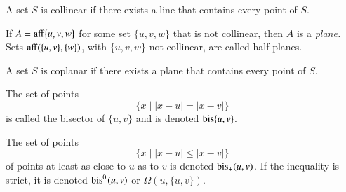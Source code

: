 \begin{tarskidata}
\begin{tarski}
\begin{definition}[collinear]  
A set $S$ is collinear if there exists
a line that contains every point of $S$.
\end{definition}
\end{tarski}

\begin{tarski}

\begin{definition}
If $A={\operatorname{aff}}\{u,v,w\}$ for some set $\{u,v,w\}$ that is not collinear,
then $A$ is a {\it plane.}  Sets ${\operatorname{aff}}(\{u,v\},\{w\})$, with
$\{u,v,w\}$ not collinear, are called half-planes.
\end{definition}
\end{tarski}

\begin{tarski}

\begin{definition}[coplanar]
A set $S$ is  coplanar if there exists
a plane that contains every point of $S$.
\end{definition}
\end{tarski}

\begin{tarski}

\begin{definition}[bisector]
The set of points 
   $$
   \{ x \mid |x - u | = |x-v|\}
   $$
is called the bisector of $\{u,v\}$ and is denoted
${\operatorname{bis}}\{u,v\}$.
\end{definition}
\end{tarski}

\begin{tarski}

\begin{definition}[$\op{bis}_+$]
The set of points
   $$
   \{ x \mid |x- u | \le |x-v|\}
   $$
of points at least as close to $u$ as to $v$ is denoted
${\operatorname{bis}}_+(u,v)$.  If the inequality is strict, it is denoted
${\operatorname{bis}}_+^0(u,v)$ or $\Omega(u,\{u,v\})$.
\end{definition}
\end{tarski}


\end{tarskidata}
